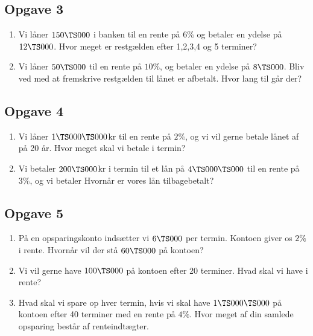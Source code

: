 \subsection*{Opgave 3}
\begin{enumerate}[label=\roman*)]
\item Vi låner $150 \TS000$ i banken til en rente på $6\%$ og betaler en ydelse på $12 \TS 000$. Hvor meget er restgælden efter 1,2,3,4 og 5 terminer?
\item Vi låner $50 \TS 000$ til en rente på $10\%$, og betaler en ydelse på $8\TS 000$. Bliv ved med at fremskrive restgælden til lånet er afbetalt. Hvor lang til går der?
\end{enumerate}

\subsection*{Opgave 4}
\begin{enumerate}[label=\roman*)]
\item Vi låner $1\TS 000 \TS 000 $kr til en rente på $2\%$, og vi vil gerne betale lånet af på 20 år. Hvor meget skal vi betale i termin?
\item Vi betaler $200 \TS 000$kr i termin til et lån på $4\TS 000 \TS 000$ til en rente på $3\%$, og vi betaler  Hvornår er vores lån tilbagebetalt?
\end{enumerate}

\subsection*{Opgave 5}
\begin{enumerate}[label=\roman*)]
	\item På en opsparingskonto indsætter vi $6 \TS 000$ per termin. Kontoen giver os $2\%$ i rente. Hvornår
	vil der stå $60 \TS 000$ på kontoen?
	\item Vi vil gerne have $100 \TS 000$ på kontoen efter 20 terminer. Hvad skal vi have i rente?
	\item Hvad skal vi spare op hver termin, hvis vi skal have $1\TS 000 \TS 000$ på kontoen efter 40 terminer 
	med en rente på $4\%$. Hvor meget af din samlede opsparing består af renteindtægter.
\end{enumerate}

